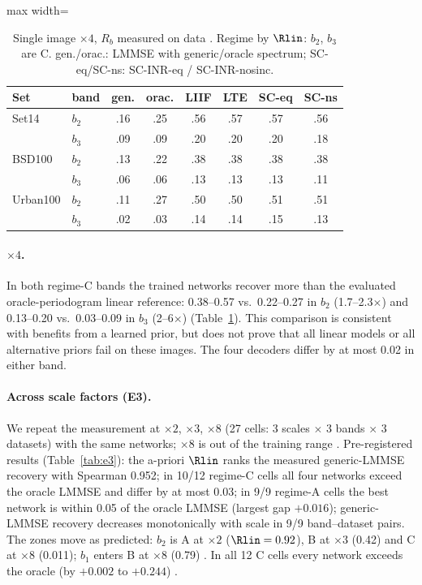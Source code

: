 \begin{table}[t]\centering\small
\caption{Single image $\times4$, $R_b$ measured on data
. Regime by $\Rlin$: $b_2$, $b_3$ are C. gen./orac.: LMMSE with generic/oracle spectrum; SC-eq/SC-ns: SC-INR-eq / SC-INR-nosinc.}
\label{tab:h6c}
\setlength{\tabcolsep}{3pt}
\begin{adjustbox}{max width=\linewidth}\begin{tabular}{llcccccc}\toprule
Set & band & gen. & orac. & LIIF & LTE & SC-eq & SC-ns\\\midrule
Set14 & $b_2$ & .16 & .25 & .56 & .57 & .57 & .56\\
 & $b_3$ & .09 & .09 & .20 & .20 & .20 & .18\\
BSD100 & $b_2$ & .13 & .22 & .38 & .38 & .38 & .38\\
 & $b_3$ & .06 & .06 & .13 & .13 & .13 & .11\\
Urban100 & $b_2$ & .11 & .27 & .50 & .50 & .51 & .51\\
 & $b_3$ & .02 & .03 & .14 & .14 & .15 & .13\\
\bottomrule\end{tabular}\end{adjustbox}
\end{table}

\paragraph{$\times4$.} In both regime-C bands the trained networks recover
more than the evaluated oracle-periodogram linear reference: 0.38--0.57 vs.\ 0.22--0.27 in $b_2$
(1.7--2.3$\times$) and 0.13--0.20 vs.\ 0.03--0.09 in $b_3$ (2--6$\times$)
(Table~\ref{tab:h6c}). This comparison is consistent with benefits from a learned prior, but does not prove that all linear models or all alternative priors fail on these images.
The four decoders differ by at most 0.02 in either band.

\paragraph{Across scale factors (E3).} We repeat the measurement at
$\times2$, $\times3$, $\times8$ (27 cells: 3 scales $\times$ 3 bands $\times$
3 datasets) with the same networks; $\times8$ is out of the training range
. Pre-registered results (Table~\ref{tab:e3}): the a-priori
$\Rlin$ ranks the measured generic-LMMSE recovery with Spearman 0.952; in
10/12 regime-C cells all four networks exceed the oracle LMMSE and differ by
at most 0.03; in 9/9 regime-A cells the best network is within 0.05 of the
oracle LMMSE (largest gap $+0.016$); generic-LMMSE recovery decreases
monotonically with scale in 9/9 band--dataset pairs. The zones move as
predicted: $b_2$ is A at $\times2$ ($\Rlin=0.92$), B at $\times3$ (0.42) and
C at $\times8$ (0.011); $b_1$ enters B at $\times8$ (0.79)
. In all 12 C cells every network exceeds the oracle
(by $+0.002$ to $+0.244$) .

